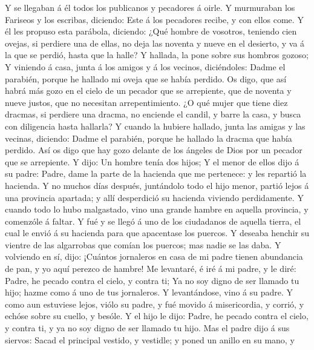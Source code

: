  Y se llegaban á él todos los publicanos y pecadores á
oirle.  Y murmuraban los Fariseos y los escribas,
diciendo: Este á los pecadores recibe, y con ellos come. 
Y él les propuso esta parábola, diciendo:  ¿Qué hombre de
vosotros, teniendo cien ovejas, si perdiere una de ellas, no deja las
noventa y nueve en el desierto, y va á la que se perdió, hasta que la
halle?  Y hallada, la pone sobre sus hombros gozoso;
 Y viniendo á casa, junta á los amigos y á los vecinos,
diciéndoles: Dadme el parabién, porque he hallado mi oveja que se había
perdido.  Os digo, que así habrá más gozo en el cielo de
un pecador que se arrepiente, que de noventa y nueve justos, que no
necesitan arrepentimiento.  ¿O qué mujer que tiene diez
dracmas, si perdiere una dracma, no enciende el candil, y barre la casa,
y busca con diligencia hasta hallarla?  Y cuando la
hubiere hallado, junta las amigas y las vecinas, diciendo: Dadme el
parabién, porque he hallado la dracma que había perdido. 
Así os digo que hay gozo delante de los ángeles de Dios por un pecador
que se arrepiente.  Y dijo: Un hombre tenía dos hijos;
 Y el menor de ellos dijo á su padre: Padre, dame la
parte de la hacienda que me pertenece: y les repartió la hacienda.
 Y no muchos días después, juntándolo todo el hijo menor,
partió lejos á una provincia apartada; y allí desperdició su hacienda
viviendo perdidamente.  Y cuando todo lo hubo malgastado,
vino una grande hambre en aquella provincia, y comenzóle á faltar.
 Y fué y se llegó á uno de los ciudadanos de aquella
tierra, el cual le envió á su hacienda para que apacentase los puercos.
 Y deseaba henchir su vientre de las algarrobas que
comían los puercos; mas nadie se las daba.  Y volviendo
en sí, dijo: ¡Cuántos jornaleros en casa de mi padre tienen abundancia
de pan, y yo aquí perezco de hambre!  Me levantaré, é iré
á mi padre, y le diré: Padre, he pecado contra el cielo, y contra ti;
 Ya no soy digno de ser llamado tu hijo; hazme como á uno
de tus jornaleros.  Y levantándose, vino á su padre. Y
como aun estuviese lejos, viólo su padre, y fué movido á misericordia, y
corrió, y echóse sobre su cuello, y besóle.  Y el hijo le
dijo: Padre, he pecado contra el cielo, y contra ti, y ya no soy digno
de ser llamado tu hijo.  Mas el padre dijo á sus siervos:
Sacad el principal vestido, y vestidle; y poned un anillo en su mano, y
